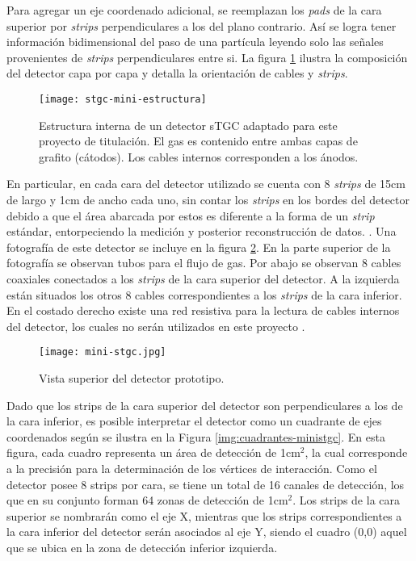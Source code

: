 	Para agregar un eje coordenado adicional, se reemplazan los \textit{pads} de la cara superior por \textit{strips} perpendiculares a los del plano contrario. Así se logra tener información bidimensional del paso de una partícula leyendo solo las señales provenientes de \textit{strips} perpendiculares entre si. La figura \ref{img:stgc-mini-estructura} ilustra la composición del detector capa por capa y detalla la orientación de cables y \textit{strips}.
	
	\begin{figure}[h]
		\centering
		\texttt{[image: stgc-mini-estructura]}
		\caption{Estructura interna de un detector sTGC adaptado para este proyecto de titulación. El gas es contenido entre ambas capas de grafito (cátodos). Los cables internos corresponden a los ánodos.}
		\label{img:stgc-mini-estructura}
	\end{figure}

	En particular, en cada cara del detector utilizado se cuenta con 8 \textit{strips} de 15cm de largo y 1cm de ancho cada uno, sin contar los \textit{strips} en los bordes del detector debido a que el área abarcada por estos es diferente a la forma de un \textit{strip} estándar, entorpeciendo la medición y posterior reconstrucción de datos. . Una fotografía de este detector se incluye en la figura \ref{img:foto-mini-stgc}. En la parte superior de la fotografía se observan tubos para el flujo de gas. Por abajo se observan 8 cables coaxiales conectados a los \textit{strips} de la cara superior del detector. A la izquierda están situados los otros 8 cables correspondientes a los \textit{strips} de la cara inferior. En el costado derecho existe una red resistiva para la lectura de cables internos del detector, los cuales no serán utilizados en este proyecto .
	
	\begin{figure}[h]
		\centering
		\texttt{[image: mini-stgc.jpg]}
		\caption{Vista superior del detector prototipo.}
		\label{img:foto-mini-stgc}
	\end{figure}	
	
	Dado que los strips de la cara superior del detector son perpendiculares a los de la cara inferior, es posible interpretar el detector como un cuadrante de ejes coordenados según se ilustra en la Figura \ref{img:cuadrantes-ministgc}. En esta figura, cada cuadro representa un área de detección de 1cm$^2$, la cual corresponde a la precisión para la determinación de los vértices de interacción. Como el detector posee 8 strips por cara, se tiene un total de 16 canales de detección, los que en su conjunto forman 64 zonas de detección de 1cm$^2$. Los strips de la cara superior se nombrarán como el eje X, mientras que los strips correspondientes a la cara inferior del detector serán asociados al eje Y, siendo el cuadro (0,0) aquel que se ubica en la zona de detección inferior izquierda.
	
